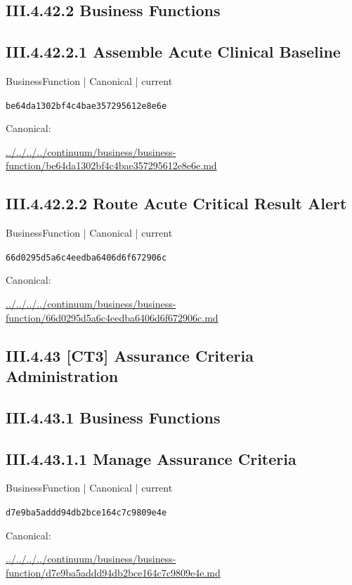 \documentclass[10pt,a4paper]{article}
\begin{document}
\subsection*{III.4.42.2 Business Functions}
\subsection*{III.4.42.2.1 Assemble Acute Clinical Baseline}
{\small BusinessFunction | Canonical | current}\par
\texttt{be64da1302bf4c4bae357295612e8e6e}\par
Canonical: \par
{\footnotesize\url{../../../../continuum/business/business-function/be64da1302bf4c4bae357295612e8e6e.md}}\par
\subsection*{III.4.42.2.2 Route Acute Critical Result Alert}
{\small BusinessFunction | Canonical | current}\par
\texttt{66d0295d5a6c4eedba6406d6f672906c}\par
Canonical: \par
{\footnotesize\url{../../../../continuum/business/business-function/66d0295d5a6c4eedba6406d6f672906c.md}}\par
\subsection*{III.4.43 [CT3] Assurance Criteria Administration}
\subsection*{III.4.43.1 Business Functions}
\subsection*{III.4.43.1.1 Manage Assurance Criteria}
{\small BusinessFunction | Canonical | current}\par
\texttt{d7e9ba5addd94db2bce164c7c9809e4e}\par
Canonical: \par
{\footnotesize\url{../../../../continuum/business/business-function/d7e9ba5addd94db2bce164c7c9809e4e.md}}\par
\end{document}
